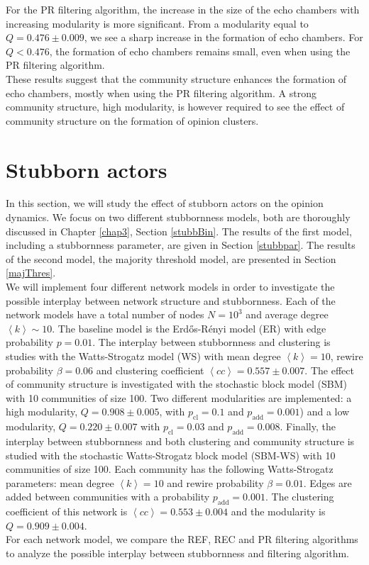 \documentclass[11 pt , letterpaper , twoside , openright]{book}
\begin{document}
\newline
For the PR filtering algorithm, the increase in the size of the echo chambers with increasing modularity is more significant. From a modularity equal to $Q = 0.476 \pm 0.009$, we see a sharp increase in the formation of echo chambers. For $Q < 0.476$, the formation of echo chambers remains small, even when using the PR filtering algorithm.\\
\newline
These results suggest that the community structure enhances the formation of echo chambers, mostly when using the PR filtering algorithm. A strong community structure, high modularity, is however required to see the effect of community structure on the formation of opinion clusters.
\newpage
\section{Stubborn actors}

In this section, we will study the effect of stubborn actors on the opinion dynamics. We focus on two different stubbornness models, both are thoroughly discussed in Chapter \ref{chap3}, Section \ref{stubbBin}. The results of the first model, including a stubbornness parameter, are given in Section \ref{stubbpar}. The results of the second model, the majority threshold model, are presented in Section \ref{majThres}.\\
\newline
We will implement four different network models in order to investigate the possible interplay between network structure and stubbornness. Each of the network models have a total number of nodes $N=10^3$ and average degree $\left<k\right> \sim 10$. The baseline model is the Erd\H{o}s-R\'{e}nyi model (ER) with edge probability $p = 0.01$. The interplay between stubbornness and clustering is studies with the Watts-Strogatz model (WS) with mean degree $\left<k\right>=10$, rewire probability $\beta = 0.06$ and clustering coefficient $\left<cc\right> = 0.557 \pm 0.007$. The effect of community structure is investigated with the stochastic block model (SBM) with 10 communities of size 100. Two different modularities are implemented: a high modularity, $Q = 0.908 \pm 0.005$, with $p_{\text{cl}} = 0.1$ and $p_{\text{add}} = 0.001$) and a low modularity, $Q = 0.220 \pm 0.007$ with $p_{\text{cl}} = 0.03$ and $p_{\text{add}} = 0.008$. Finally, the interplay between stubbornness and both clustering and community structure is studied with the stochastic Watts-Strogatz block model (SBM-WS) with 10 communities of size 100. Each community has the following Watts-Strogatz parameters: mean degree $\left<k\right> = 10$ and rewire probability $\beta = 0.01$. Edges are added between communities with a probability $p_{\text{add}} = 0.001$. The clustering coefficient of this network is $\left<cc\right> = 0.553 \pm 0.004$ and the modularity is $Q = 0.909 \pm 0.004$.\\
\newline
For each network model, we compare the REF, REC and PR filtering algorithms to analyze the possible interplay between stubbornness and filtering algorithm.
\end{document}
